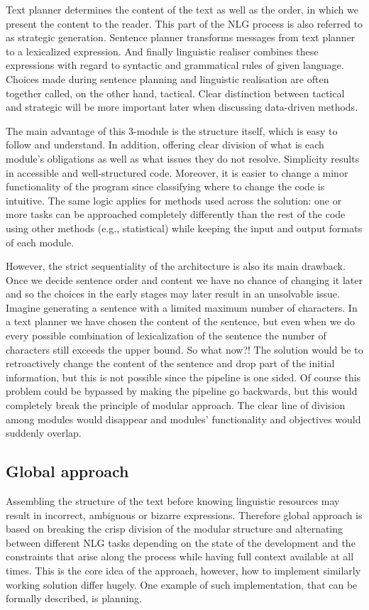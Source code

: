 Text planner determines the content of the text as well as the order, in which we present the content to the reader. This part of the NLG process is also referred to as strategic generation. Sentence planner transforms messages from text planner to a lexicalized expression. And finally linguistic realiser combines these expressions with regard to syntactic and grammatical rules of given language. Choices made during sentence planning and linguistic realisation are often together called, on the other hand, tactical. Clear distinction between tactical and strategic will be more important later when discussing data-driven methods.

The main advantage of this 3-module is the structure itself, which is easy to follow and understand. In addition, offering clear division of what is each module’s obligations as well as what issues they do not resolve. Simplicity results in accessible and well-structured code. Moreover, it is easier to change a minor functionality of the program since classifying where to change the code is intuitive. The same logic applies for methods used across the solution: one or more tasks can be approached completely differently than the rest of the code using other methods (e.g., statistical) while keeping the input and output formats of each module.

However, the strict sequentiality of the architecture is also its main drawback. Once we decide sentence order and content we have no chance of changing it later and so the choices in the early stages may later result in an unsolvable issue. Imagine generating a sentence with a limited maximum number of characters. In a text planner we have chosen the content of the sentence, but even when we do every possible combination of lexicalization of the sentence the number of characters still exceeds the upper bound. So what now?! The solution would be to retroactively change the content of the sentence and drop part of the initial information, but this is not possible since the pipeline is one sided. Of course this problem could be bypassed by making the pipeline go backwards, but this would completely break the principle of modular approach. The clear line of division among modules would disappear and modules' functionality and objectives would suddenly overlap. 

\subsection{Global approach}
Assembling the structure of the text before knowing linguistic resources may result in incorrect, ambiguous or bizarre expressions. Therefore global approach is based on breaking the crisp division of the modular structure and alternating between different NLG tasks depending on the state of the development and the constraints that arise along the process while having full context available at all times. This is the core idea of the approach, however, how to implement similarly working solution differ hugely. One example of such implementation, that can be formally described, is planning.

